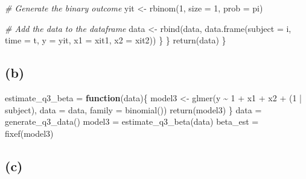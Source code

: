 \documentclass[
]{article}
\newenvironment{Shaded}{\begin{snugshade}}{\end{snugshade}}
\newcommand{\AttributeTok}[1]{\textcolor[rgb]{0.77,0.63,0.00}{#1}}
\newcommand{\CommentTok}[1]{\textcolor[rgb]{0.56,0.35,0.01}{\textit{#1}}}
\newcommand{\ControlFlowTok}[1]{\textcolor[rgb]{0.13,0.29,0.53}{\textbf{#1}}}
\newcommand{\DecValTok}[1]{\textcolor[rgb]{0.00,0.00,0.81}{#1}}
\newcommand{\FunctionTok}[1]{\textcolor[rgb]{0.00,0.00,0.00}{#1}}
\newcommand{\NormalTok}[1]{#1}
\newcommand{\OtherTok}[1]{\textcolor[rgb]{0.56,0.35,0.01}{#1}}
\newcommand{\SpecialCharTok}[1]{\textcolor[rgb]{0.00,0.00,0.00}{#1}}
\begin{document}
\begin{Shaded}
\begin{Highlighting}[]
      \CommentTok{\# Generate the binary outcome}
\NormalTok{      yit }\OtherTok{\textless{}{-}} \FunctionTok{rbinom}\NormalTok{(}\DecValTok{1}\NormalTok{, }\AttributeTok{size =} \DecValTok{1}\NormalTok{, }\AttributeTok{prob =}\NormalTok{ pi)}
      
      \CommentTok{\# Add the data to the dataframe}
\NormalTok{      data }\OtherTok{\textless{}{-}} \FunctionTok{rbind}\NormalTok{(data, }\FunctionTok{data.frame}\NormalTok{(}\AttributeTok{subject =}\NormalTok{ i, }\AttributeTok{time =}\NormalTok{ t, }\AttributeTok{y =}\NormalTok{ yit, }\AttributeTok{x1 =}\NormalTok{ xit1, }\AttributeTok{x2 =}\NormalTok{ xit2))}
\NormalTok{    \}}
\NormalTok{  \}}
      \FunctionTok{return}\NormalTok{(data)}
\NormalTok{\}}
\end{Highlighting}
\end{Shaded}

\hypertarget{b-2}{%
\subsection{(b)}\label{b-2}}

\begin{Shaded}
\begin{Highlighting}[]
\NormalTok{estimate\_q3\_beta }\OtherTok{=} \ControlFlowTok{function}\NormalTok{(data)\{}
\NormalTok{  model3 }\OtherTok{\textless{}{-}} \FunctionTok{glmer}\NormalTok{(y }\SpecialCharTok{\textasciitilde{}} \DecValTok{1} \SpecialCharTok{+}\NormalTok{ x1 }\SpecialCharTok{+}\NormalTok{ x2 }\SpecialCharTok{+}\NormalTok{ (}\DecValTok{1} \SpecialCharTok{|}\NormalTok{ subject), }\AttributeTok{data =}\NormalTok{ data, }\AttributeTok{family =} \FunctionTok{binomial}\NormalTok{())}
  \FunctionTok{return}\NormalTok{(model3)}
\NormalTok{\}}
\NormalTok{data }\OtherTok{=} \FunctionTok{generate\_q3\_data}\NormalTok{()}
\NormalTok{model3 }\OtherTok{=} \FunctionTok{estimate\_q3\_beta}\NormalTok{(data)}
\NormalTok{beta\_est }\OtherTok{=} \FunctionTok{fixef}\NormalTok{(model3)}
\end{Highlighting}
\end{Shaded}

\hypertarget{c-2}{%
\subsection{(c)}\label{c-2}}
\end{document}
